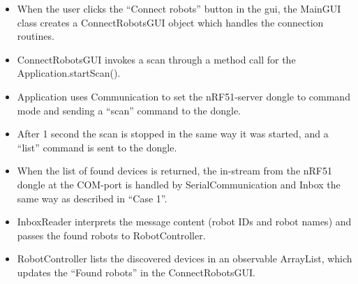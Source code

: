 \begin{itemize}
    \item When the user clicks the ``Connect robots'' button in the \acrshort{gui}, the MainGUI class creates a ConnectRobotsGUI object which handles the connection routines.
    \item ConnectRobotsGUI invokes a scan through a method call for the Application.startScan().
    \item Application uses Communication to set the nRF51-server dongle to command mode and sending a ``scan'' command to the dongle.
    \item After 1 second the scan is stopped in the same way it was started, and a ``list'' command is sent to the dongle.
    \item When the list of found devices is returned, the in-stream from the nRF51 dongle at the COM-port is handled by SerialCommunication and Inbox the same way as described in ``Case 1''.
    \item InboxReader interprets the message content (robot IDs and robot names) and passes the found robots to RobotController.
    \item RobotController lists the discovered devices in an observable ArrayList, which updates the ``Found robots'' in the ConnectRobotsGUI.
\end{itemize}